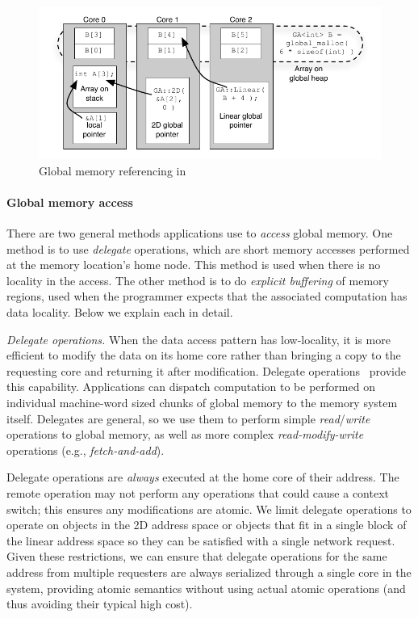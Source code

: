 \begin{figure}[t]
\begin{center}
  \includegraphics[width=0.95\columnwidth]{figs/memory-structure}
\begin{minipage}{0.95\columnwidth}
  \caption{\label{fig:memory-structure} Global memory referencing in \Grappa}
\end{minipage}
\vspace{-3ex}
\end{center}
\end{figure}

\paragraph{Global memory access} There are two general methods \Grappa
applications use to {\em access} global memory. One method is to use {\em
delegate} operations, which are short memory accesses performed at the memory
location's home node. This method is used when there is no locality in the
access. The other method is to do {\em explicit buffering} of memory regions,
used when the programmer expects that the associated computation has data
locality. Below we explain each in detail.


\vspace{1ex} \textit{Delegate operations.} When the data access pattern has
low-locality, it is more efficient to modify the data on its home core rather
than bringing a copy to the requesting core and returning it after
modification. Delegate operations~\cite{Nelson:hotpar11, delegated:oopsla11}
provide this capability. Applications can dispatch computation to be performed
on individual machine-word sized chunks of global memory to the memory system
itself. Delegates are general, so we use them to perform simple
\emph{read\/}/\emph{write\/} operations to global memory, as well as more complex \emph{read-modify-write\/} operations (e.g., \emph{fetch-and-add\/}). 

Delegate operations are \emph{always\/} executed at the home core of their
address. The remote operation may not perform any operations that could cause
a context switch; this ensures any modifications are atomic. We limit delegate
operations to operate on objects in the 2D address space or objects that fit
in a single block of the linear address space so they can be satisfied with a
single network request. Given these restrictions, we can ensure that delegate
operations for the same address from multiple requesters are always serialized
through a single core in the system, providing atomic semantics without using
actual atomic operations (and thus avoiding their typical high cost).

